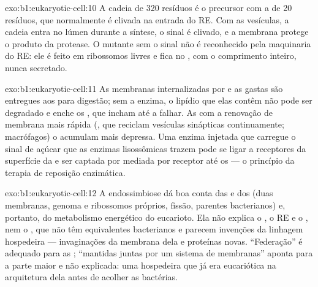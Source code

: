 \begin{solution}{exo:b1:eukaryotic-cell:10}
A cadeia de \qty{320}{} resíduos é o precursor com a  de
\qty{20}{} resíduos, que normalmente é clivada na entrada do RE. Com as
vesículas, a cadeia entra no lúmen durante a síntese, o sinal é clivado,
e a membrana protege o produto da protease. O mutante sem o sinal não é
reconhecido pela maquinaria do RE: ele é feito em ribossomos livres e
fica no , com o comprimento inteiro, nunca secretado.
\end{solution}

\begin{solution}{exo:b1:eukaryotic-cell:11}
As membranas internalizadas por  e as  gastas são
entregues aos  para digestão; sem a enzima, o lipídio que elas
contêm não pode ser degradado e enche os , que incham até a
 falhar. As  com a renovação de membrana mais rápida
(, que reciclam vesículas sinápticas continuamente; macrófagos)
o acumulam mais depressa. Uma enzima injetada que carregue o sinal de
açúcar que as enzimas lisossômicas trazem pode se ligar a receptores da
superfície da  e ser captada por  mediada por receptor
até os  --- o princípio da terapia de reposição enzimática.
\end{solution}

\begin{solution}{exo:b1:eukaryotic-cell:12}
A endossimbiose dá boa conta das  e dos  (duas
membranas, genoma e ribossomos próprios, fissão, parentes bacterianos)
e, portanto, do metabolismo energético do eucarioto. Ela não explica o
, o RE e o , nem o , que não têm equivalentes
bacterianos e parecem invenções da linhagem hospedeira --- invaginações
da membrana dela e proteínas novas. ``Federação'' é adequado para as
; ``mantidas juntas por um sistema de membranas'' aponta para a
parte maior e não explicada: uma  hospedeira que já era eucariótica
na arquitetura dela antes de acolher as bactérias.
\end{solution}

